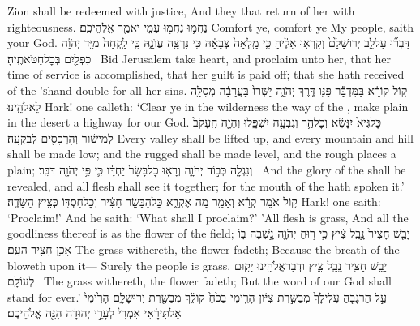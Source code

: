 {Zion shall be redeemed with justice, And they that return of her with righteousness.}
\label{haft_45}
\setcounter{chap}{40}
\setcounter{verse}{1}
{נַחֲמ֥וּ נַחֲמ֖וּ עַמִּ֑י יֹאמַ֖ר אֱלֹֽהֵיכֶֽם׃}
{Comfort ye, comfort ye My people, saith your God.}
{דַּבְּר֞וּ עַל\maqqaf לֵ֤ב יְרוּשָׁלַ֙͏ִם֙ וְקִרְא֣וּ אֵלֶ֔יהָ כִּ֤י מָֽלְאָה֙ צְבָאָ֔הּ כִּ֥י נִרְצָ֖ה עֲוֺנָ֑הּ כִּ֤י לָֽקְחָה֙ מִיַּ֣ד יְהֹוָ֔ה כִּפְלַ֖יִם בְּכׇל\maqqaf חַטֹּאתֶֽיהָ׃ \setuma }
{Bid Jerusalem take heart, and proclaim unto her, that her time of service is accomplished, that her guilt is paid off; that she hath received of the \lord\textsc{’s}\space hand double for all her sins.}
{ק֣וֹל קוֹרֵ֔א בַּמִּדְבָּ֕ר פַּנּ֖וּ דֶּ֣רֶךְ יְהֹוָ֑ה יַשְּׁרוּ֙ בָּעֲרָבָ֔ה מְסִלָּ֖ה לֵאלֹהֵֽינוּ׃}
{Hark! one calleth: ‘Clear ye in the wilderness the way of the \lord, make plain in the desert a highway for our God.}
{כׇּל\maqqaf גֶּיא֙ יִנָּשֵׂ֔א וְכׇל\maqqaf הַ֥ר וְגִבְעָ֖ה יִשְׁפָּ֑לוּ וְהָיָ֤ה הֶֽעָקֹב֙ לְמִישׁ֔וֹר וְהָרְכָסִ֖ים לְבִקְעָֽה׃}
{Every valley shall be lifted up, and every mountain and hill shall be made low; and the rugged shall be made level, and the rough places a plain;}
{וְנִגְלָ֖ה כְּב֣וֹד יְהֹוָ֑ה וְרָא֤וּ כׇל\maqqaf בָּשָׂר֙ יַחְדָּ֔ו כִּ֛י פִּ֥י יְהֹוָ֖ה דִּבֵּֽר׃ \petucha }
{And the glory of the \lord\space shall be revealed, and all flesh shall see it together; for the mouth of the \lord\space hath spoken it.’}
{ק֚וֹל אֹמֵ֣ר קְרָ֔א וְאָמַ֖ר מָ֣ה אֶקְרָ֑א כׇּל\maqqaf הַבָּשָׂ֣ר חָצִ֔יר וְכׇל\maqqaf חַסְדּ֖וֹ כְּצִ֥יץ הַשָּׂדֶֽה׃}
{Hark! one saith: ‘Proclaim!’ And he saith: ‘What shall I proclaim?’ ’All flesh is grass, And all the goodliness thereof is as the flower of the field;}
{יָבֵ֤שׁ חָצִיר֙ נָ֣בֵֽל צִ֔יץ כִּ֛י ר֥וּחַ יְהֹוָ֖ה נָ֣שְׁבָה בּ֑וֹ אָכֵ֥ן חָצִ֖יר הָעָֽם׃}
{The grass withereth, the flower fadeth; Because the breath of the \lord\space bloweth upon it— Surely the people is grass.}
{יָבֵ֥שׁ חָצִ֖יר נָ֣בֵֽל צִ֑יץ וּדְבַר\maqqaf אֱלֹהֵ֖ינוּ יָק֥וּם לְעוֹלָֽם׃ \setuma }
{The grass withereth, the flower fadeth; But the word of our God shall stand for ever.’}
{עַ֣ל הַר\maqqaf גָּבֹ֤הַּ עֲלִי\maqqaf לָךְ֙ מְבַשֶּׂ֣רֶת צִיּ֔וֹן הָרִ֤ימִי בַכֹּ֙חַ֙ קוֹלֵ֔ךְ מְבַשֶּׂ֖רֶת יְרוּשָׁלָ֑͏ִם הָרִ֙ימִי֙ אַל\maqqaf תִּירָ֔אִי אִמְרִי֙ לְעָרֵ֣י יְהוּדָ֔ה הִנֵּ֖ה אֱלֹהֵיכֶֽם׃}
